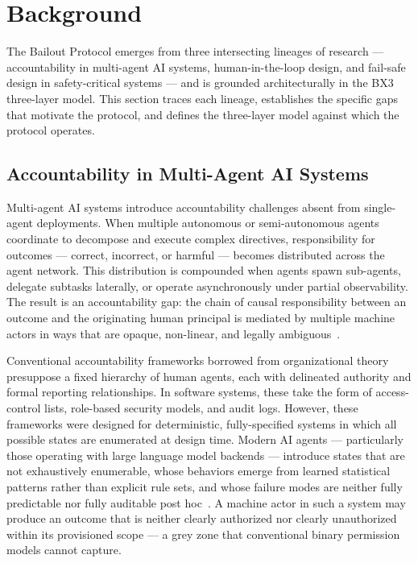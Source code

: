 \section{Background}
\label{sec:background}

The Bailout Protocol emerges from three intersecting lineages of research --- accountability in multi-agent AI systems, human-in-the-loop design, and fail-safe design in safety-critical systems --- and is grounded architecturally in the BX3 three-layer model. This section traces each lineage, establishes the specific gaps that motivate the protocol, and defines the three-layer model against which the protocol operates.

\subsection{Accountability in Multi-Agent AI Systems}
\label{sec:accountability}

Multi-agent AI systems introduce accountability challenges absent from single-agent deployments. When multiple autonomous or semi-autonomous agents coordinate to decompose and execute complex directives, responsibility for outcomes --- correct, incorrect, or harmful --- becomes distributed across the agent network. This distribution is compounded when agents spawn sub-agents, delegate subtasks laterally, or operate asynchronously under partial observability. The result is an accountability gap: the chain of causal responsibility between an outcome and the originating human principal is mediated by multiple machine actors in ways that are opaque, non-linear, and legally ambiguous~\cite{bansal2019}.

Conventional accountability frameworks borrowed from organizational theory presuppose a fixed hierarchy of human agents, each with delineated authority and formal reporting relationships. In software systems, these take the form of access-control lists, role-based security models, and audit logs. However, these frameworks were designed for deterministic, fully-specified systems in which all possible states are enumerated at design time. Modern AI agents --- particularly those operating with large language model backends --- introduce states that are not exhaustively enumerable, whose behaviors emerge from learned statistical patterns rather than explicit rule sets, and whose failure modes are neither fully predictable nor fully auditable post hoc~\cite{dijkstra1982}. A machine actor in such a system may produce an outcome that is neither clearly authorized nor clearly unauthorized within its provisioned scope --- a grey zone that conventional binary permission models cannot capture.

